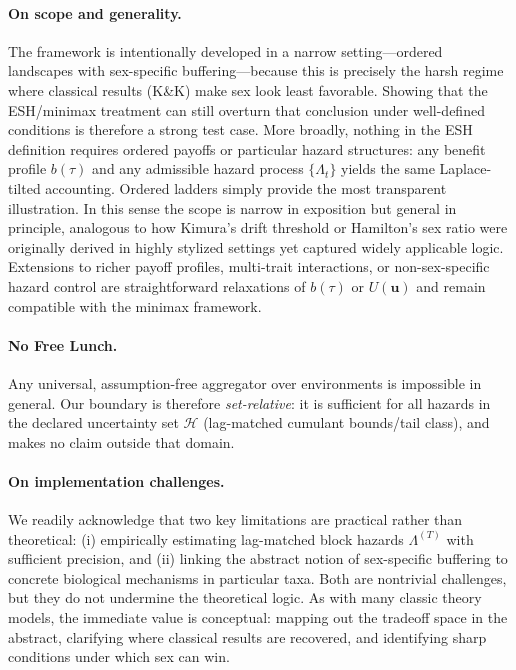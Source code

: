 \documentclass[11pt]{article}
\theoremstyle{upright}
\newcommand{\Hset}{\mathcal{H}}
\newcommand{\hazT}[1]{\Lambda^{(#1)}}          %
\begin{document}
\paragraph{On scope and generality.}
The framework is intentionally developed in a narrow setting—ordered landscapes with sex-specific buffering—because this is precisely the harsh regime where classical results (K\&K) make sex look least favorable. Showing that the ESH/minimax treatment can still overturn that conclusion under well-defined conditions is therefore a strong test case. More broadly, nothing in the ESH definition requires ordered payoffs or particular hazard structures: any benefit profile $b(\tau)$ and any admissible hazard process $\{\Lambda_t\}$ yields the same Laplace-tilted accounting. Ordered ladders simply provide the most transparent illustration. In this sense the scope is narrow in exposition but general in principle, analogous to how Kimura’s drift threshold or Hamilton’s sex ratio were originally derived in highly stylized settings yet captured widely applicable logic. Extensions to richer payoff profiles, multi-trait interactions, or non-sex-specific hazard control are straightforward relaxations of $b(\tau)$ or $U(\mathbf u)$ and remain compatible with the minimax framework.

\paragraph{No Free Lunch.}
Any universal, assumption-free aggregator over environments is impossible in general. Our boundary is therefore \emph{set-relative}: it is sufficient for all
hazards in the declared uncertainty set $\Hset$ (lag-matched cumulant bounds/tail class), and makes no claim outside that domain.

\paragraph{On implementation challenges.}
We readily acknowledge that two key limitations are practical rather than theoretical: (i) empirically estimating lag-matched block hazards $\hazT{T}$ with sufficient precision, and (ii) linking the abstract notion of sex-specific buffering to concrete biological mechanisms in particular taxa. Both are nontrivial challenges, but they do not undermine the theoretical logic. As with many classic theory models, the immediate value is conceptual: mapping out the tradeoff space in the abstract, clarifying where classical results are recovered, and identifying sharp conditions under which sex can win.
\end{document}
